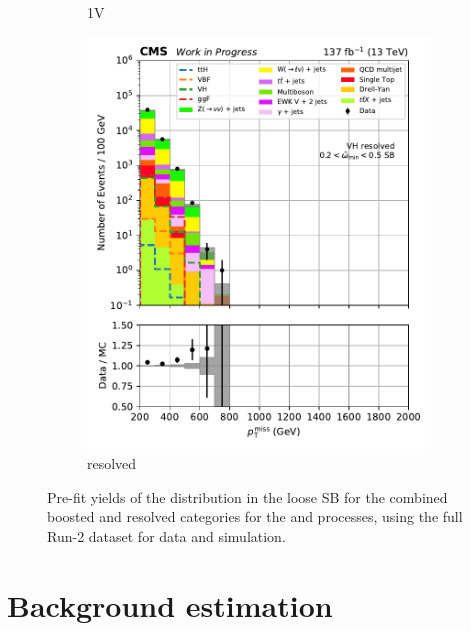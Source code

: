 \begin{figure}[htbp]
\begin{subfigure}[b]{0.24\textwidth}
        \caption{\VH 1V}
    \end{subfigure}
    \hfill
    \begin{subfigure}[b]{0.24\textwidth}
        \includegraphics[width=\textwidth]{figures/region_plots/full_Run2/sideband_4/VH_resolved.pdf}
        \caption{\VH resolved}
    \end{subfigure}
    \caption[Pre-fit yields of the \ptmiss distribution in the loose \omegaTilde sideband for the combined boosted and resolved categories for the \ttH and \VH processes, using the full Run-2 dataset for data and simulation]{Pre-fit yields of the \ptmiss distribution in the loose \omegaTilde \gls{SB} for the combined boosted and resolved categories for the \ttH and \VH processes, using the full Run-2 dataset for data and simulation.}
    \label{fig:htoinv_sb_yields_comb2016to18_loose_minOmegaTilde}
\end{figure}





\section{Background estimation}
\label{sec:htoinv_background_est}

